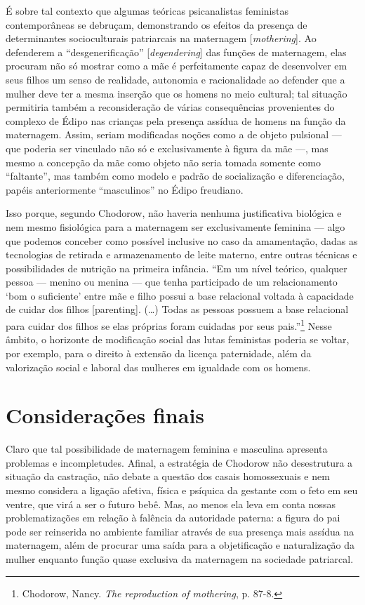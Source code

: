 É sobre tal contexto que algumas teóricas psicanalistas feministas
contemporâneas se debruçam, demonstrando os efeitos da presença de
determinantes socioculturais patriarcais na maternagem
{[}\emph{mothering}{]}. Ao defenderem a ``desgenerificação''
{[}\emph{degendering}{]} das funções de maternagem, elas procuram não só
mostrar como a mãe é perfeitamente capaz de desenvolver em seus filhos
um senso de realidade, autonomia e racionalidade ao defender que a
mulher deve ter a mesma inserção que os homens no meio cultural; tal
situação permitiria também a reconsideração de várias consequências
provenientes do complexo de Édipo nas crianças pela presença assídua de
homens na função da maternagem. Assim, seriam modificadas noções como a
de objeto pulsional --- que poderia ser vinculado não só e exclusivamente
à figura da mãe ---, mas mesmo a concepção da mãe como objeto não seria
tomada somente como ``faltante'', mas também como modelo e padrão de
socialização e diferenciação, papéis anteriormente ``masculinos'' no
Édipo freudiano.

Isso porque, segundo Chodorow, não haveria nenhuma justificativa
biológica e nem mesmo fisiológica para a maternagem ser exclusivamente
feminina --- algo que podemos conceber como possível inclusive no caso da
amamentação, dadas as tecnologias de retirada e armazenamento de leite
materno, entre outras técnicas e possibilidades de nutrição na primeira
infância. ``Em um nível teórico, qualquer pessoa --- menino ou menina ---
que tenha participado de um relacionamento `bom o suficiente' entre mãe
e filho possui a base relacional voltada à capacidade de cuidar dos
filhos {[}parenting{]}. (\ldots{}) Todas as pessoas possuem a base
relacional para cuidar dos filhos se elas próprias foram cuidadas por
seus pais.''\footnote{Chodorow, Nancy. \emph{The reproduction of
  mothering}, p. 87-8.} Nesse âmbito, o horizonte de modificação social
das lutas feministas poderia se voltar, por exemplo, para o direito à
extensão da licença paternidade, além da valorização social e laboral
das mulheres em igualdade com os homens.

\section{Considerações finais}

Claro que tal possibilidade de maternagem feminina e masculina apresenta
problemas e incompletudes. Afinal, a estratégia de Chodorow não
desestrutura a situação da castração, não debate a questão dos casais
homossexuais e nem mesmo considera a ligação afetiva, física e psíquica
da gestante com o feto em seu ventre, que virá a ser o futuro bebê. Mas,
ao menos ela leva em conta nossas problematizações em relação à falência
da autoridade paterna: a figura do pai pode ser reinserida no ambiente
familiar através de sua presença mais assídua na maternagem, além de
procurar uma saída para a objetificação e naturalização da mulher
enquanto função quase exclusiva da maternagem na sociedade patriarcal.

